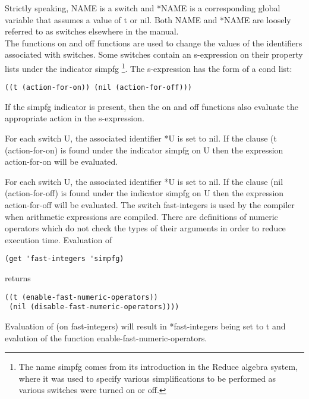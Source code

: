 Strictly   speaking,   NAME   is  a  switch  and  *NAME  is  a
corresponding global variable that assumes a value of t  or  nil.
Both  NAME  and  *NAME  are  loosely  referred  to  as  switches
elsewhere in the manual.\\

\noindent
The functions on and off functions  are  used  to  change  the
values  of  the  identifiers  associated  with  switches.   Some
switches contain an s-expression on their property  lists  under
the  indicator  simpfg \footnote{The name simpfg comes from its
introduction in the Reduce algebra system, where it was used  to
specify  various  simplifications  to  be  performed  as various
switches were turned on or off.}.  The s-expression has the form
of a cond list:

\begin{verbatim}
((t (action-for-on)) (nil (action-for-off)))
\end{verbatim}
If the  simpfg  indicator  is  present,  then  the  on  and  off
functions   also   evaluate   the   appropriate  action  in  the
s-expression.


{    For each switch U, the associated identifier *U  is  set  to
    nil.   If  the  clause (t (action-for-on) is found under the
    indicator simpfg on U then the expression action-for-on will
    be evaluated.
}

{    For each switch U, the associated identifier *U  is  set  to
    nil.  If the clause (nil (action-for-off) is found under the
    indicator  simpfg  on  U  then the expression action-for-off
    will be evaluated.
}
  The  switch  fast-integers  is  used  by  the  compiler   when
arithmetic  expressions  are compiled.  There are definitions of
numeric  operators  which  do  not  check  the  types  of  their
arguments in order to reduce execution time.  Evaluation of

\begin{verbatim}
(get 'fast-integers 'simpfg)
\end{verbatim}
returns

\begin{verbatim}
((t (enable-fast-numeric-operators))
 (nil (disable-fast-numeric-operators))))
\end{verbatim}
Evaluation  of  (on fast-integers) will result in *fast-integers
being   set   to   t   and    evalution    of    the    function
enable-fast-numeric-operators.

